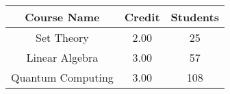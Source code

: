 \documentclass{article}
\begin{document}
	\begin{tabular} {|c|c|c|}
		\toprule[2 pt]
		\hline
		Course Name & Credit & Students \\
		\hline
		Set Theory & 2.00 & 25 \\
		\hline
		Linear Algebra & 3.00 & 57 \\
		\hline
		Quantum Computing & 3.00 & 108 \\
		\hline
		\bottomrule[2 pt]
	\end{tabular}
\end{document}
